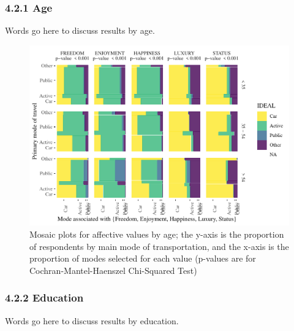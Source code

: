 \documentclass[]{elsarticle} %
\makeatletter
\def\maxwidth{\ifdim\Gin@nat@width>\linewidth\linewidth
\else\Gin@nat@width\fi}
\let\Oldincludegraphics\includegraphics
\renewcommand{\includegraphics}[1]{\Oldincludegraphics[width=\maxwidth]{#1}}
\makeatother
\begin{document}
\hypertarget{age-1}{%
\subsubsection{4.2.1 Age}\label{age-1}}

Words go here to discuss results by age.

\begin{figure}
\centering
\includegraphics{Dissonance_Santiago_v1_files/figure-latex/figure-mosaic-plots-by-attribute-and-age-1.pdf}
\caption{\label{fig:mosaic-plots-by-age}Mosaic plots for affective
values by age; the y-axis is the proportion of respondents by main mode
of transportation, and the x-axis is the proportion of modes selected
for each value (p-values are for Cochran-Mantel-Haenszel Chi-Squared
Test)}
\end{figure}

\hypertarget{education-1}{%
\subsubsection{4.2.2 Education}\label{education-1}}

Words go here to discuss results by education.
\end{document}
